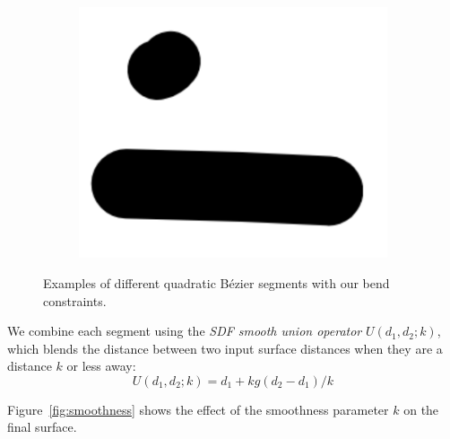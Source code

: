 \documentclass[%
reprint,
twocolumn,
nofootinbib,
 amsmath,amssymb,
 aps,
]{revtex4-2}
\begin{document}
\begin{figure}
\begin{subfigure}{0.2\textwidth}
    \end{subfigure}
    \begin{subfigure}{0.15\textwidth}
        \includegraphics[width=0.98\linewidth]{img/seg4.png}
    \end{subfigure}
    \caption{Examples of different quadratic B\'ezier segments with our bend constraints.}
    \label{fig:bend}
\end{figure}

We combine each segment using the \emph{SDF smooth union operator} $U(d_1, d_2;k)$, which blends the distance between two input surface distances when they are a distance $k$ or less away:~\cite{iqsmooth}
\begin{equation}
    U(d_1, d_2; k) = d_1 + kg(d_2-d_1)/k
\end{equation}

Figure~\ref{fig:smoothness} shows the effect of the smoothness parameter $k$ on the final surface.
\end{document}
